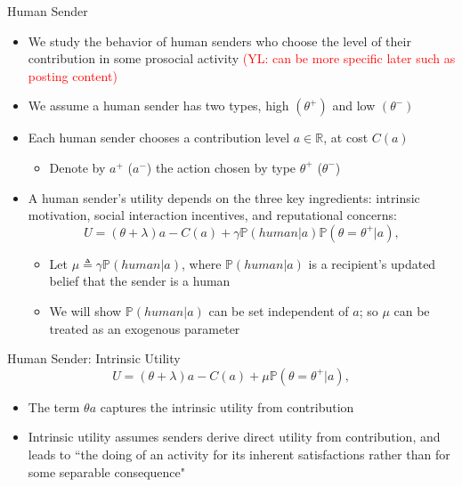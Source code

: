 \documentclass[9pt,aspectratio=1610]{beamer}
\begin{document}
\begin{frame}{Human Sender}
\begin{itemize}\setlength{\itemsep}{1em}
    \item We study the behavior of \textcolor{orange0}{human senders} who choose the level of their contribution in some prosocial activity \textcolor{red}{(YL: can be more specific later such as posting content)}
    \item We assume a human sender has two types, high $(\theta^+)$ and low $(\theta^-)$
    \item Each human sender chooses a contribution level $a\in \mathbb{R}$, at cost $C(a)$
    \begin{itemize}
        \item Denote by $a^+$ ($a^-$) the action chosen by type $\theta^+$ ($\theta^-$)
    \end{itemize}
    \item A human sender's utility depends on the three key ingredients: intrinsic motivation, social interaction incentives, and reputational concerns:
    \begin{equation*}
        U = (\theta + \lambda )a - C(a) + \gamma \mathbb{P}(human|a)\mathbb{P}(\theta=\theta^+|a),
    \end{equation*}
    \begin{itemize}
        \item Let $\mu\triangleq \gamma \mathbb{P}(human|a)$, where $\mathbb{P}(human|a)$ is a recipient's updated belief that the sender is a human
        \item We will show $\mathbb{P}(human|a)$ can be set independent of $a$; so $\mu$ can be treated as an exogenous parameter
    \end{itemize}
\end{itemize}
\end{frame}

\begin{frame}{Human Sender: Intrinsic Utility}
\begin{equation*}
    U = (\theta + \lambda )a - C(a) + \mu \mathbb{P}(\theta=\theta^+|a),
\end{equation*}
\vspace{.5em}
\begin{itemize}\setlength{\itemsep}{1em}
    \item The term $\theta a$ captures the intrinsic utility from contribution
    \item Intrinsic utility assumes senders derive direct utility from contribution, and leads to ``the doing of an activity for its inherent satisfactions rather than for some separable consequence"
\end{itemize}
\end{frame}
\end{document}

